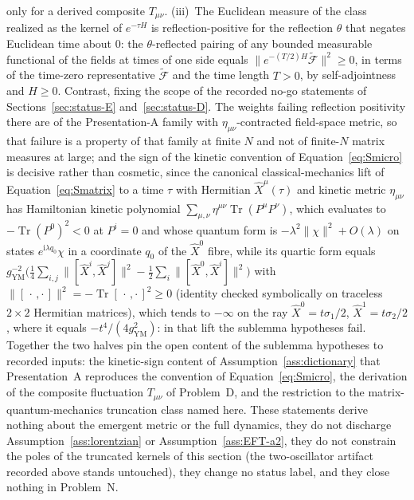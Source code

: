 only for a derived composite \(T_{\mu\nu}\). (iii)~The Euclidean measure of the class realized as the kernel of \(e^{-\tau H}\) is reflection-positive for the reflection \(\theta\) that negates Euclidean time about \(0\): the \(\theta\)-reflected pairing of any bounded measurable functional of the fields at times of one side equals \(\|e^{-(T/2)H}\widetilde{\mathcal F}\|^2\ge0\), in terms of the time-zero representative \(\widetilde{\mathcal F}\) and the time length \(T>0\), by self-adjointness and \(H\ge0\). Contrast, fixing the scope of the recorded no-go statements of Sections~\ref{sec:status-E} and~\ref{sec:status-D}. The weights failing reflection positivity there are of the Presentation-A family with \(\eta_{\mu\nu}\)-contracted field-space metric, so that failure is a property of that family at finite \(N\) and not of finite-\(N\) matrix measures at large; and the sign of the kinetic convention of Equation~\eqref{eq:Smicro} is decisive rather than cosmetic, since the canonical classical-mechanics lift of Equation~\eqref{eq:Smatrix} to a time \(\tau\) with Hermitian \(\hat X^\mu(\tau)\) and kinetic metric \(\eta_{\mu\nu}\) has Hamiltonian kinetic polynomial \(\sum_{\mu,\nu}\eta^{\mu\nu}\operatorname{Tr}(P^\mu P^\nu)\), which evaluates to \(-\operatorname{Tr}(P^0)^2<0\) at \(P^i=0\) and whose quantum form is \(-\lambda^2\|\chi\|^2+O(\lambda)\) on states \(e^{\mathrm i\lambda q_0}\chi\) in a coordinate \(q_0\) of the \(\hat X^0\) fibre, while its quartic form equals \(g_{\mathrm{YM}}^{-2}\bigl(\tfrac14\sum_{i,j}\|[\hat X^i,\hat X^j]\|^2-\tfrac12\sum_i\|[\hat X^0,\hat X^i]\|^2\bigr)\) with \(\|[\,\cdot\,,\cdot\,]\|^2=-\operatorname{Tr}[\,\cdot\,,\cdot\,]^2\ge0\) (identity checked symbolically on traceless \(2\times2\) Hermitian matrices), which tends to \(-\infty\) on the ray \(\hat X^0=t\sigma_1/2\), \(\hat X^1=t\sigma_2/2\), where it equals \(-t^4/(4g_{\mathrm{YM}}^2)\): in that lift the sublemma hypotheses fail. Together the two halves pin the open content of the sublemma hypotheses to recorded inputs: the kinetic-sign content of Assumption~\ref{ass:dictionary} that Presentation~A reproduces the convention of Equation~\eqref{eq:Smicro}, the derivation of the composite fluctuation \(T_{\mu\nu}\) of Problem~D, and the restriction to the matrix-quantum-mechanics truncation class named here. These statements derive nothing about the emergent metric or the full dynamics, they do not discharge Assumption~\ref{ass:lorentzian} or Assumption~\ref{ass:EFT-a2}, they do not constrain the poles of the truncated kernels of this section (the two-oscillator artifact recorded above stands untouched), they change no status label, and they close nothing in Problem~N.

